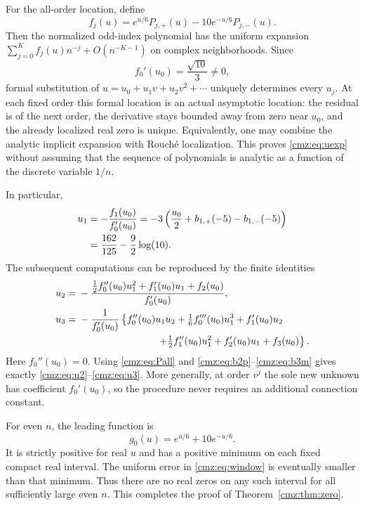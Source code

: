 \documentclass[11pt,letterpaper]{article}
\numberwithin{equation}{section}
\theoremstyle{definition}\newtheorem{definition}[theorem]{Definition}
\theoremstyle{remark}\newtheorem{remark}[theorem]{Remark}
\begin{document}
For the all-order location, define
\begin{equation}
f_j(u)=e^{u/6}P_{j,+}(u)-10e^{-u/6}P_{j,-}(u).
\label{cmz:eq:fj}
\end{equation}
Then the normalized odd-index polynomial has the uniform expansion $\sum_{j=0}^K f_j(u)n^{-j}+O(n^{-K-1})$ on complex neighborhoods. Since
\begin{equation}
f_0'(u_0)=\frac{\sqrt{10}}{3}\ne0,
\label{cmz:eq:simplederiv}
\end{equation}
formal substitution of $u=u_0+u_1v+u_2v^2+\cdots$ uniquely determines every $u_j$. At each fixed order this formal location is an actual asymptotic location: the residual is of the next order, the derivative stays bounded away from zero near $u_0$, and the already localized real zero is unique. Equivalently, one may combine the analytic implicit expansion with Rouch\'e localization. This proves \eqref{cmz:eq:uexp} without assuming that the sequence of polynomials is analytic as a function of the discrete variable $1/n$.

In particular,
\begin{align}
u_1&=-\frac{f_1(u_0)}{f_0'(u_0)}
=-3\left(\frac{u_0}{2}+b_{1,+}(-5)-b_{1,-}(-5)\right)\notag\\
&=\frac{162}{125}-\frac92\log(10).
\label{cmz:eq:u1proof}
\end{align}
The subsequent computations can be reproduced by the finite identities
\begin{align}
u_2={}&-\frac{\tfrac12 f_0''(u_0)u_1^2+f_1'(u_0)u_1+f_2(u_0)}{f_0'(u_0)},
\label{cmz:eq:u2rec}\\
u_3={}&-\frac{1}{f_0'(u_0)}\left\{
 f_0''(u_0)u_1u_2+\tfrac16f_0'''(u_0)u_1^3+f_1'(u_0)u_2\right.\notag\\
&\hspace{8em}\left.+\tfrac12f_1''(u_0)u_1^2+f_2'(u_0)u_1+f_3(u_0)\right\}.
\label{cmz:eq:u3rec}
\end{align}
Here $f_0''(u_0)=0$. Using \eqref{cmz:eq:Pall} and \eqref{cmz:eq:b2p}--\eqref{cmz:eq:b3m} gives exactly \eqref{cmz:eq:u2}--\eqref{cmz:eq:u3}. More generally, at order $v^j$ the sole new unknown has coefficient $f_0'(u_0)$, so the procedure never requires an additional connection constant.

For even $n$, the leading function is
\[
g_0(u)=e^{u/6}+10e^{-u/6}.
\]
It is strictly positive for real $u$ and has a positive minimum on each fixed compact real interval. The uniform error in \eqref{cmz:eq:window} is eventually smaller than that minimum. Thus there are no real zeros on any such interval for all sufficiently large even $n$. This completes the proof of Theorem~\ref{cmz:thm:zero}.
\end{document}
